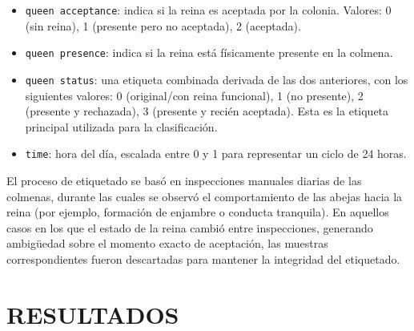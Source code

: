 \documentclass[12pt]{report}
\newenvironment{tightmulticols}{%
  \begin{multicols}{2}
  \setlength{\parskip}{0pt}
  \setlength{\parindent}{0em}
  \linespread{1}\selectfont
}{%
  \end{multicols}
}
\begin{document}
\begin{tightmulticols}
\begin{itemize}
	\item[\ding{43}] \texttt{queen acceptance}: indica si la reina es aceptada por la colonia. Valores: 0 (sin reina), 1 (presente pero no aceptada), 2 (aceptada).
	\item[\ding{43}] \texttt{queen presence}: indica si la reina está físicamente presente en la colmena.
	\item[\ding{43}] \texttt{queen status}: una etiqueta combinada derivada de las dos anteriores, con los siguientes valores: 0 (original/con reina funcional), 1 (no presente), 2 (presente y rechazada), 3 (presente y recién aceptada). Esta es la etiqueta principal utilizada para la clasificación.
	\item[\ding{43}] \texttt{time}: hora del día, escalada entre 0 y 1 para representar un ciclo de 24 horas.
\end{itemize}

\par El proceso de etiquetado se basó en inspecciones manuales diarias de las colmenas, durante las cuales se observó el comportamiento de las abejas hacia la reina (por ejemplo, formación de enjambre o conducta tranquila). En aquellos casos en los que el estado de la reina cambió entre inspecciones, generando ambigüedad sobre el momento exacto de aceptación, las muestras correspondientes fueron descartadas para mantener la integridad del etiquetado.

\end{tightmulticols}


\pagebreak
\chapter{RESULTADOS}
\vspace{-3em}


\end{document}
